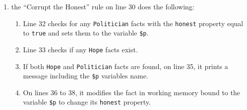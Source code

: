 \begin{enumerate}[topsep=2pt,itemsep=2pt,partopsep=2pt, parsep=2pt]
\begin{enumerate}[topsep=2pt,itemsep=2pt,partopsep=2pt, parsep=2pt]
    \end{enumerate}
    \item the ``Corrupt the Honest'' rule on line 30 does the following:
    \begin{enumerate}[topsep=2pt,itemsep=2pt,partopsep=2pt, parsep=2pt]
        \setlength\itemsep{0em}
        \item Line 32 checks for any \texttt{Politician} facts with the \texttt{honest} property equal to \texttt{true} and sets them to the variable \texttt{\$p}.
        \item Line 33 checks if any \texttt{Hope} facts exist.
        \item If both \texttt{Hope} and \texttt{Politician} facts are found, on line 35, it prints a message including the \texttt{\$p} variables name.
        \item On lines 36 to 38, it modifies the fact in working memory bound to the variable \texttt{\$p} to change its \texttt{honest} property.
    \end{enumerate}
\end{enumerate}